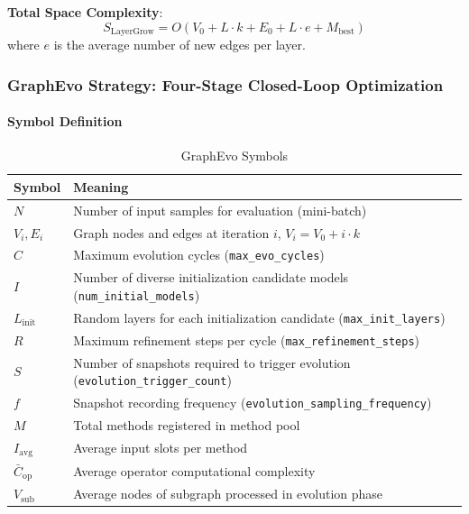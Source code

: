 \textbf{Total Space Complexity}:
\begin{equation}
    S_{\mathrm{LayerGrow}} = O(V_0 + L \cdot k + E_0 + L \cdot e + M_{\mathrm{best}})
\end{equation}
where $e$ is the average number of new edges per layer.

\subsubsection{GraphEvo Strategy: Four-Stage Closed-Loop Optimization}

\paragraph{Symbol Definition}
\begin{table}[htbp]
    \centering
    \caption{GraphEvo Symbols}
    \label{tab:symbols_ge}
    \begin{tabularx}{\linewidth}{@{}l>{\raggedright\arraybackslash}X@{}}
        \toprule
        \textbf{Symbol} & \textbf{Meaning} \\
        \midrule
        $N$ & Number of input samples for evaluation (mini-batch) \\
        $V_i, E_i$ & Graph nodes and edges at iteration $i$, $V_i = V_0 + i \cdot k$ \\
        $C$ & Maximum evolution cycles (\texttt{max\_evo\_cycles}) \\
        $I$ & Number of diverse initialization candidate models (\texttt{num\_initial\_models}) \\
        $L_{\mathrm{init}}$ & Random layers for each initialization candidate (\texttt{max\_init\_layers}) \\
        $R$ & Maximum refinement steps per cycle (\texttt{max\_refinement\_steps}) \\
        $S$ & Number of snapshots required to trigger evolution (\texttt{evolution\_trigger\_count}) \\
        $f$ & Snapshot recording frequency (\texttt{evolution\_sampling\_frequency}) \\
        $M$ & Total methods registered in method pool \\
        $I_{\mathrm{avg}}$ & Average input slots per method \\
        $\bar{C}_{\mathrm{op}}$ & Average operator computational complexity \\
        $V_{\mathrm{sub}}$ & Average nodes of subgraph processed in evolution phase \\
        \bottomrule
    \end{tabularx}
\end{table}

